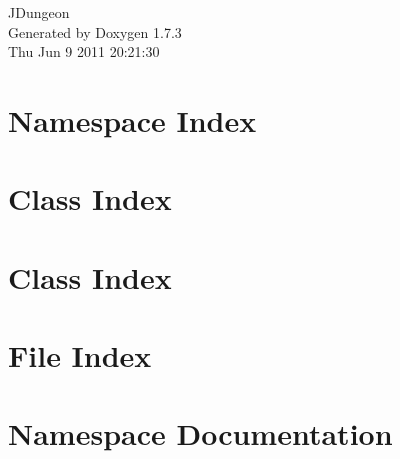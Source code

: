 \documentclass[a4paper]{book}
\begin{document}
\hypersetup{pageanchor=false}
\begin{titlepage}
\vspace*{7cm}
\begin{center}
{\Large JDungeon }\\
\vspace*{1cm}
{\large Generated by Doxygen 1.7.3}\\
\vspace*{0.5cm}
{\small Thu Jun 9 2011 20:21:30}\\
\end{center}
\end{titlepage}
\clearemptydoublepage
{}
\tableofcontents
\clearemptydoublepage
{}
\hypersetup{pageanchor=true}
\chapter{Namespace Index}

\chapter{Class Index}

\chapter{Class Index}

\chapter{File Index}

\chapter{Namespace Documentation}













\end{document}
